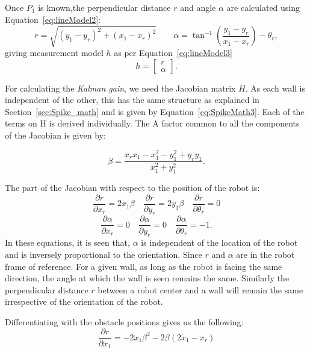Once $ P_1 $ is known,the perpendicular distance $ r $ and angle $ \alpha $ are calculated using Equation~\ref{eq:lineModel2}:
\begin{equation}
	\label{eq:lineModel2}
	r=\sqrt{(y_1-y_r)^2+(x_1-x_r)^2}
	\qquad
	\alpha = \tan^{-1}\left(\frac{y_1-y_r}{x_1-x_r}\right)-\theta_r,
\end{equation}
giving measurement model $ h $ as per Equation~\ref{eq:lineModel3}
\begin{equation}
	\label{eq:lineModel3}
	h=\begin{bmatrix}
	r\\\alpha
	\end{bmatrix}.
\end{equation}

For calculating the \textit{Kalman gain}, we need the Jacobian matrix $ H $. As each wall is independent of the other, this has the same structure as explained in Section~\ref{sec:Spike_math} and is given by Equation~\ref{eq:SpikeMath3}. Each of the terms on H is derived individually. The 
 A factor common to all the components of the Jacobian is given by:

  \begin{equation}	
	\beta = \frac{x_rx_1-x_1^2-y_1^2+y_ry_1}{x_1^2+y_1^2}.
  \end{equation}

The part of the Jacobian with respect to the position of the robot is:
  \begin{equation}
	\frac{\partial r}{\partial x_r} = 2x_1\beta \quad
	\frac{\partial r}{\partial y_r} = 2y_1\beta \quad
	\frac{\partial r}{\partial \theta_r} = 0 
  \end{equation}
  \begin{equation}
	\frac{\partial \alpha}{\partial x_r} = 0 \quad 
	\frac{\partial \alpha}{\partial y_r} = 0 \quad 
	\frac{\partial \alpha}{\partial \theta_r} = -1.
  \end{equation}
In these equations, it is seen that, $ \alpha $ is independent of the location of the robot and is inversely proportional to the orientation. Since $ r $ and $ \alpha $ are in the robot frame of reference. For a given wall, as long as the robot is facing the same direction, the angle at which the wall is seen remains the same. Similarly the perpendicular distance $ r $ between a robot center and a wall will remain the same irrespective of the orientation of the robot. 

Differentiating with the obstacle positions gives us the following:
	\begin{equation}
  \frac{\partial r}{\partial x_1} = -2x_1\beta^2 - 2\beta(2x_1-x_r)
  \end{equation}

